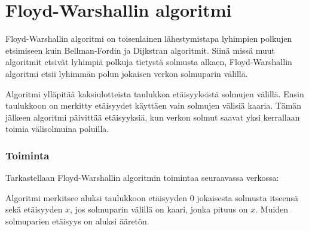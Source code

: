 \section{Floyd-Warshallin algoritmi}

Floyd-Warshallin algoritmi on toisenlainen
lähestymistapa lyhimpien polkujen
etsimiseen kuin Bellman-Fordin ja
Dijkstran algoritmit.
Siinä missä muut algoritmit
etsivät lyhimpiä polkuja
tietystä solmusta alkaen,
Floyd-Warshallin algoritmi etsii
lyhimmän polun jokaisen verkon
solmuparin välillä.

Algoritmi ylläpitää kaksiulotteista
taulukkoa etäisyyksistä solmujen
välillä.
Ensin taulukkoon on merkitty
etäisyydet käyttäen vain solmujen
välisiä kaaria.
Tämän jälkeen algoritmi
päivittää etäisyyksiä,
kun verkon solmut saavat yksi kerrallaan
toimia välisolmuina poluilla.

\subsubsection{Toiminta}

Tarkastellaan Floyd-Warshallin
algoritmin toimintaa seuraavassa verkossa:

\begin{center}
\end{center}

Algoritmi merkitsee aluksi taulukkoon
etäisyyden 0 jokaisesta solmusta itseensä
sekä etäisyyden $x$, jos solmuparin välillä
on kaari, jonka pituus on $x$.
Muiden solmuparien etäisyys on aluksi ääretön.

